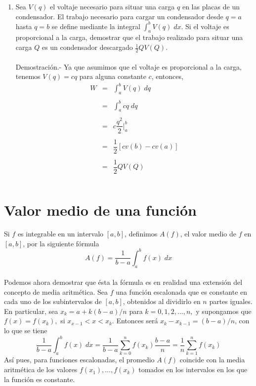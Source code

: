 \begin{enumerate}[ \bfseries 1.]
    \item Sea $V(q)$ el voltaje necesario para situar una carga $q$ en las placas de un condensador. El trabajo necesario para cargar un condensador desde $q=a$ hasta $q=b$ se define mediante la integral $\int_a^b V(q)\; dx$. Si el voltaje es proporcional a la carga, demostrar que el trabajo realizado para situar una carga $Q$ es un condensador descargado $\frac{1}{2}QV(Q)$.\\\\
	Demostración.-\; Ya que asumimos que el voltaje es proporcional a la carga, tenemos $V(q)=cq$ para alguna constante $c$, entonces,
	$$\begin{array}{rcl}
	    W&=&\displaystyle\int_a^b V(q)\; dq\\\\
	    &=&\displaystyle\int_a^b cq\; dq\\\\
	    &=&c\dfrac{q^2}{2}\bigg|_a^b\\\\
	    &=&\dfrac{1}{2}\left[cv(b)-cv(a)\right]\\\\
	    &=&\dfrac{1}{2}QV(Q)\\\\
	\end{array}$$
    
\end{enumerate}


\section{Valor medio de una función}

\begin{tcolorbox}
    \begin{def.}
	Si $f$ es integrable en un intervalo $[a,b]$, definimos $A(f)$, el valor medio de $f$ en $[a,b]$, por la siguiente fórmula
	$$A(f) = \dfrac{1}{b-a} \int_a^b f(x) \; dx$$\\
    Podemos ahora demostrar que ésta la fórmula es en realidad una extensión del concepto de media aritmética. Sea $f$ una función escalonada que es constante en cada uno de los subintervalos de $[a,b]$, obtenidos al dividirlo en $n$ partes iguales. En particular, sea $x_k=a+k(b-a)/n$ para $k=0,1,2,\ldots,n,$ y supongamos que $f(x)=f(x_k),$ si $x_{x-1}<x<x_k$. Entonces será $x_k - x_{k-1} = (b-a)/n$, con lo que se tiene
    $$\dfrac{1}{b-a}\int_a^b f(x)\; dx = \dfrac{1}{b-a}\sum_{k=0}^n f(x_k) \dfrac{b-a}{n} = \dfrac{1}{n} \sum_{k=1}^n f(x_k)$$
    Así pues, para funciones escalonadas, el promedio $A(f)$ coincide con la media aritmética de los valores $f(x_1),\ldots , f(x_k)$ tomados en los intervalos en los que la función es constante.
    
    \end{def.}
\end{tcolorbox}

